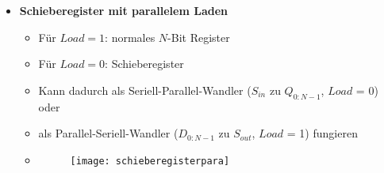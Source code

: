 \begin{itemize}
\item \textbf{Schieberegister mit parallelem Laden}
	\begin{itemize}
	\item Für $Load = 1$: normales $N$-Bit Register
	\item Für $Load = 0$: Schieberegister
	\item Kann dadurch als Seriell-Parallel-Wandler ($S_{in}$ zu $Q_{0:N-1}$, $Load$ = 0) oder
	\item als Parallel-Seriell-Wandler ($D_{0:N-1}$ zu $S_{out}$, $Load$ = 1) fungieren
	\item[]
		\begin{figure}[H]
		\begin{center}
		\texttt{[image: schieberegisterpara]}
		\end{center}
		\end{figure}
	\end{itemize}
\end{itemize}

